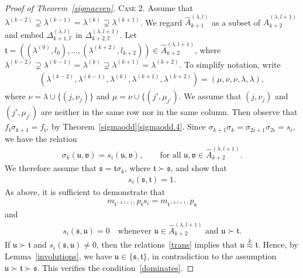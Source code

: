 \documentclass[11pt,a4paper,reqno,svgnames]{amsart}
\theoremstyle{plain}
\theoremstyle{definition}
\numberwithin{equation}{section}
\begin{document}
\begin{proof}[Proof of Theorem~\ref{sigmaeven}]
{\textsc{Case 2.}} Assume that $\lambda^{(k-2)}\supsetneq \lambda^{(k-1)}=\lambda^{(k)}\supsetneq \lambda^{(k+1)}$. We regard $\hat{A}_{k+1}^{(\lambda,l)}$ as a subset of $\hat{A}_{k+2}^{(\lambda,l+1)}$ and embed $\Delta_{k+1,\mathbb{F}}^{(\lambda,l)}$  in $\Delta_{k+2,\mathbb{F}}^{(\lambda,l+1)}$. Let $\mathfrak{t}=((\lambda^{(0)},l_0),\ldots,(\lambda^{(k+2)},l_{k+2}))\in\hat{A}_{k+2}^{(\lambda,l+1)}$, where $\lambda^{(k-2)}\supsetneq \lambda^{(k-1)}=\lambda^{(k)}\supsetneq \lambda^{(k+1)}=\lambda^{(k+2)}$. To simplify notation, write 
\begin{align*}
(\lambda^{(k-2)},\lambda^{(k-1)},\lambda^{(k)},\lambda^{(k+1)},\lambda^{(k+2)})=
(\mu,\nu,\nu,\lambda,\lambda),
\end{align*}
where $\nu=\lambda\cup\lbrace(j,\nu_j)\rbrace$ and $\mu=\nu\cup \lbrace (j',\mu_{j'})$. We assume that  $(j,\nu_j)$ and $(j',\mu_{j'})$ are neither in the same row nor in the same column. Then observe that  $f_\mathfrak{t}\sigma_{k+1}=f_\mathfrak{t}$, by Theorem~\ref{sigmaodd}\eqref{sigmaodd.4}. Since $\sigma_{k+1}\sigma_{k}=\sigma_{2i+1}\sigma_{2i}=s_i$, we have the relation
\begin{align}\label{trans}
\sigma_{k}(\mathfrak{u},\mathfrak{v})=s_i(\mathfrak{u},\mathfrak{v}), \qquad\text{for all $\mathfrak{u,v}\in\hat{A}_{k+2}^{(\lambda, l+1 )}$.}
\end{align}
We therefore assume that $\mathfrak{s}=\mathfrak{t}\sigma_k$, where $\mathfrak{t}\succ\mathfrak{s}$, and show that 
\begin{align}\label{transposition}
s_i(\mathfrak{s,t})=1. 
\end{align}
As above, it is sufficient to demonstrate that 
\begin{align}\label{switch}
m_{\mathfrak{t}^{(\lambda,l+1)}}p_\mathfrak{t}s_i= m_{\mathfrak{t}^{(\lambda,l+1)}}p_\mathfrak{s}
\end{align}
and
\begin{align}\label{dominates}
s_i(\mathfrak{s,u})=0\quad\text{whenever $\mathfrak{u}\in\hat{A}^{(\lambda,l+1)}_{k+2}$ and $\mathfrak{u}\succ\mathfrak{t}$.}
\end{align}
If $\mathfrak{u}\succ\mathfrak{t}$ and $s_i(\mathfrak{s,u})\ne0$, then the relations~\eqref{trans} implies that $\mathfrak{u}\stackrel{k}{\approx}\mathfrak{t}$. Hence, by Lemma~\ref{involutions}, we have $\mathfrak{u}\in\lbrace \mathfrak{s,t}\rbrace$, in contradiction to the assumption $\mathfrak{u}\succ\mathfrak{t}\succ\mathfrak{s}$.  This verifies the condition~\eqref{dominates}. 


\end{proof}
\end{document}
